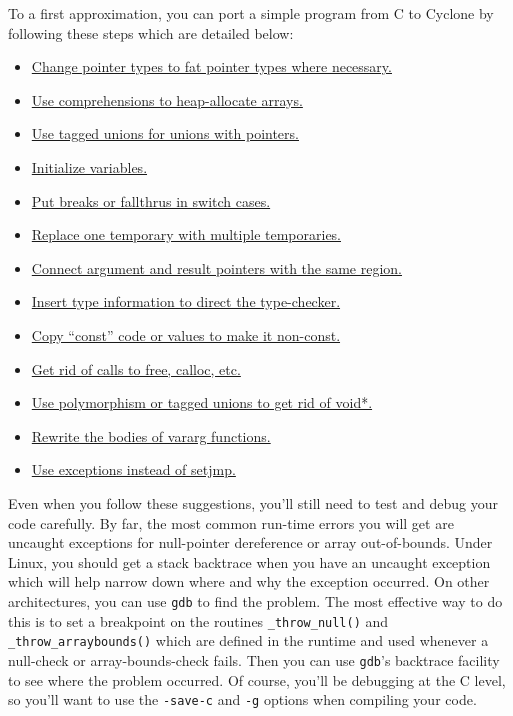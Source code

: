 To a first approximation, you can port a simple program
from C to Cyclone by following these steps which are
detailed below:
\begin{itemize}
\item \hyperlink{port:pointers}{Change pointer types to fat pointer types where necessary.}  
\item \hyperlink{port:malloc}{Use comprehensions to heap-allocate arrays.}
\item \hyperlink{port:unions}{Use tagged unions for unions with pointers.}
\item \hyperlink{port:initialize}{Initialize variables.}  
\item \hyperlink{port:cases}{Put breaks or fallthrus in switch cases.} 
\item \hyperlink{port:temp}{Replace one temporary with multiple temporaries.}  
\item \hyperlink{port:rgns}{Connect argument and result pointers with the same region.}
\item \hyperlink{port:types}{Insert type information to direct the type-checker.}
\item \hyperlink{port:const}{Copy ``const'' code or values to make it non-const.}  
\item \hyperlink{port:free}{Get rid of calls to free, calloc, etc.}
\item \hyperlink{port:poly}{Use polymorphism or tagged unions to get rid of void*.}  
\item \hyperlink{port:vararg}{Rewrite the bodies of vararg functions.}
\item \hyperlink{port:setjmp}{Use exceptions instead of setjmp.}
\end{itemize}

Even when you follow these suggestions, you'll still need to test and
debug your code carefully.  By far, the most common run-time errors
you will get are uncaught exceptions for null-pointer dereference
or array out-of-bounds.  Under Linux, you should get a stack backtrace
when you have an uncaught exception which will help narrow down
where and why the exception occurred.  On other architectures, you
can use \texttt{gdb} to find the problem.  The most effective way
to do this is to set a breakpoint on the routines \texttt{\_throw\_null()}
and \texttt{\_throw\_arraybounds()} which are defined in the
runtime and used whenever a null-check or array-bounds-check fails.
Then you can use \texttt{gdb}'s backtrace facility to see where
the problem occurred.  Of course, you'll be debugging at the C
level, so you'll want to use the \texttt{-save-c} and \texttt{-g}
options when compiling your code.  

